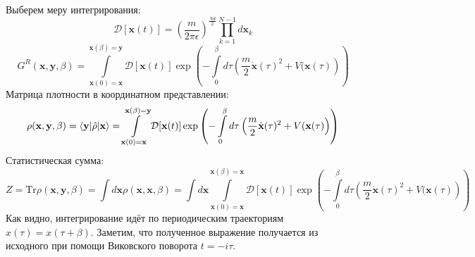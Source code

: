\documentclass[12pt]{article}
\theoremstyle{definition}
\begin{document}
Выберем меру интегрирования:
\begin{equation}
    \mathcal{D}[\textbf{x}(t)]=\left(\frac{m}{2\pi\epsilon}\right)^\frac{Nd}{2}\prod\limits_{k=1}^{N-1}d\textbf{x}_k
\end{equation}
\begin{equation}
    G^R(\textbf{x},\textbf{y},\beta)=\int\limits_{\textbf{x}(0)=\textbf{x}}^{\textbf{x}(\beta)=\textbf{y}}\mathcal{D}[\textbf{x}(t)]\exp\left(-\int\limits_0^\beta d\tau\left(\frac{m}{2}\dot{\textbf{x}}(\tau)^2+V(\textbf{x}(\tau)\right)\right)
\end{equation}
Матрица плотности в координатном представлении:
\begin{equation}
    \rho(\textbf{x},\textbf{y},\beta)=\braket{\textbf{y}|\hat{\rho}|\textbf{x}}=\int\limits_{\textbf{x}(0)=\textbf{x}}^{\textbf{x}(\beta)=\textbf{y}}\mathcal{D}[\textbf{x}(t)]\exp\left(-\int\limits_0^\beta d\tau\left(\frac{m}{2}\dot{\textbf{x}}(\tau)^2+V(\textbf{x}(\tau)\right)\right)
\end{equation}
Статистическая сумма:
\begin{equation*}
    \boxed{Z=\text{Tr}\rho(\textbf{x},\textbf{y},\beta)=\int d\textbf{x}\rho(\textbf{x},\textbf{x},\beta)=\int d\textbf{x}\int\limits_{\textbf{x}(0)=\textbf{x}}^{\textbf{x}(\beta)=\textbf{x}}\mathcal{D}[\textbf{x}(t)]\exp\left(-\int\limits_0^\beta d\tau\left(\frac{m}{2}\dot{\textbf{x}}(\tau)^2+V(\textbf{x}(\tau)\right)\right)}
\end{equation*}
Как видно, интегрирование идёт по периодическим траекториям $x(\tau)=x(\tau+\beta)$. Заметим, что полученное выражение получается из исходного при помощи Виковского поворота $t=-i\tau$.
\end{document}
